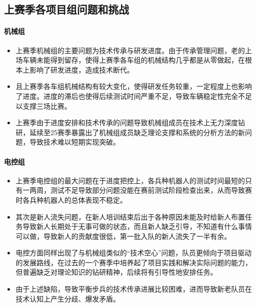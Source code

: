 \subsection{上赛季各项目组问题和挑战}

    \paragraph{机械组}


        \begin{itemize}
            \item 上赛季机械组的主要问题为技术传承与研发进度。由于传承管理问题，老的上场车辆未能得到留存，使得上赛季各车组的机械结构几乎都是从零做起，在根本上影响了研发进度，造成技术断代。
            \item 且上赛季各车组机械结构有较大变化，使得研发任务较重，一定程度上也影响了进度。进度的滞后也使得后续测试时间严重不足，导致车辆稳定性完全不足以支撑三场比赛。
            \item 上赛季由于进度安排和技术传承的问题导致机械组成员在技术上无力深度钻研，延续至25赛季暴露出了机械组成员缺乏理论支撑和系统的分析方法的新问题，导致技术难以短期实现突破。
        \end{itemize}

    \paragraph{电控组}


        \begin{itemize}
            \item 上赛季电控组的最大问题在于进度把控上，各兵种机器人的测试时间最短的只有一两周，测试不足导致部分问题没能在赛前测试阶段检查出来，从而导致赛时各兵种机器人的总体表现不稳定。
            \item 其次是新人流失问题，在新人培训结束后出于各种原因未能及时给新人布置任务导致新人长期处于无事可做的状态，而且新人缺乏引导，不知道有什么事情可以做，导致新人的贡献度很低，第一批入队的新人流失了一半有余。
            \item 电控方面同样出现了与机械组类似的“技术空心”问题，队员更倾向于项目驱动的发展路线，在过去的一个赛季中培养起了项目实践和解决实际问题的能力，但普遍缺乏对理论知识的钻研精神，后续将有引导性地安排任务。
            \item 由于上述缺陷，导致平衡步兵的技术传承进展比较困难，进而导致新老队员在技术认知上产生分歧、爆发矛盾。
        \end{itemize}

